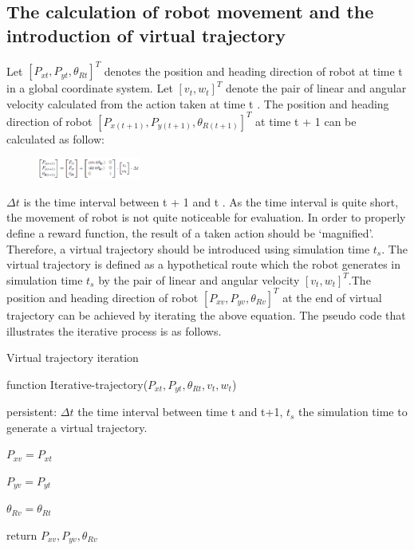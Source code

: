 \documentclass{acmtog} %
\begin{document}
	\subsection{The calculation of robot movement and the introduction of virtual trajectory}
	Let $[P_{xt},P_{yt},\theta_{Rt}]^T$ denotes the position and heading direction of robot at time t in a global coordinate
	system. Let $[v_t,w_t]^T$ denote the pair of linear and angular velocity calculated from the action taken
	at time t . The position and heading direction of robot  $[P_{x(t+1)},P_{y(t+1)},\theta_{R(t+1)}]^T$ at time t + 1 can be
	calculated as follow:
	\begin{figure}[H]
		\centering
		\includegraphics[width=0.3\textwidth]{vt.PNG}
	\end{figure}
	$\Delta t$ is the time interval between t + 1 and t . As the time interval is quite short, the
	movement of robot is not quite noticeable for evaluation. In order to properly define a reward function,
	the result of a taken action should be ‘magnified’. Therefore, a virtual trajectory should be introduced
	using simulation time $t_s$. The virtual trajectory is defined as a hypothetical route which the robot
	generates in simulation time $t_s$ by the pair of linear and angular velocity $[v_t,w_t]^T$.The position and
	heading direction of robot $[P_{xv},P_{yv},\theta_{Rv}]^T$ at the end of virtual trajectory can be achieved by iterating the above equation. 
	The pseudo code that illustrates the iterative process is as follows.
	\begin{algorithm}
		\caption{Virtual trajectory iteration}
		function Iterative-trajectory($P_{xt},P_{yt},\theta_{Rt},v_t,w_t$)
		
		persistent: $\Delta t$ the time interval between time t and t+1, $t_s$ the simulation time to generate a virtual trajectory.
		
		$P_{xv} = P_{xt}$
		
		$P_{yv} = P_{yt}$
		
		$\theta_{Rv} = \theta_{Rt}$
		
		return $P_{xv},P_{yv},\theta_{Rv}$
	\end{algorithm}
	
\end{document}
